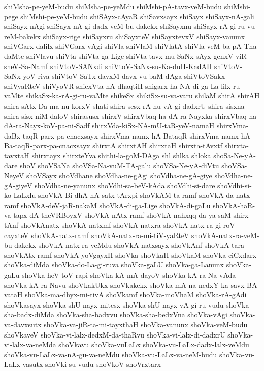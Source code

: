 {shiMsha-pe-yeM-budu
shiMsha-pe-yeMdu
shiMshi-pA-tavx-veM-budu
shiMshi-pege
shiMshi-pe-yeM-budu
shiSAyx-cAyaR
shiSavxsayx
shiSayx
shiSayx-nA-gali
shiSayx-nAgi
shiSayx-nA-gi-dadx-veM-bu-dakekx
shiSayxnu
shiSayx-rA-gi-ru-vu-reM-bakekx
shiSayx-rige
shiSayxru
shiSayxteV
shiSayxtevxV
shiSayx-vanunx
shiVGarx-dalilx
shiVGarx-vAgi
shiVla
shiVlaM
shiVlatA
shiVla-veM-ba-pA-Tha-daMte
shiVlavu
shiVta
shiVta-ga-Lige
shiVta-tavx-mu-SaNx-sAyx-genxV-viR-sheV-Sa-Namf
shiVtoV-SANxdi
shiVtoV-SaNx-su-Ka-duH-KadAH
shiVtoV-SaNx-yoV-riva
shiVtoV-SaTx-davxM-davx-vu-baM-dAga
shiVtoVSakx
shiVyaRteV
shiVyoVR
shicxVta-nA-dhaqtiH
shigarx-ha-NA-di-ga-La-lilx-ru-vaMte
shikaSx-ka-rA-gi-ru-vaMte
shikeSx
shikiSx-su-va-varu
shilaM
shirA
shirAH
shira-sAtx-Da-ma-nu-korxV-shati
shira-sesx-rA-hu-vA-gi-dadxrU
shira-sisxna
shira-sisx-niM-daloV
shirasusx
shirxV
shirxVbaq-ha-dA-ra-Nayxka
shirxVbaq-ha-dA-ra-Nayx-koV-pa-ni-Sadf
shirxVda-kiSx-NA-mU-taR-yeV-namaH
shirxVma-daBx-taqR-parx-pa-cnacxsayx
shirxVma-namx-hA-BataqR
shirxVma-namx-hA-Ba-taqR-parx-pa-cnacxsayx
shirxtA
shirxtAH
shirxtaH
shirxta-tAvxtf
shirxta-tavxtaH
shirxtayx
shirxteYva
shithi-la-goM-DAga
shl
shlka
shloka
shoSa-Ne-yA-dare
shoV
shoVSaNa
shoVSa-Na-vuM-TA-galu
shoVSa-Ne-yA-diVtu
shoVSa-NeyeV
shoVSayx
shoVdhane
shoVdha-ne-gAgi
shoVdha-ne-gA-giye
shoVdha-ne-gA-giyeV
shoVdha-ne-yanunx
shoVdhi-sa-beV-kAda
shoVdhi-si-dare
shoVdhi-si-ko-LaLxlu
shoVkA-Bi-dhA-nA-satx-tArxpi
shoVkAM-ta-ramf
shoVkA-da-natx-ramf
shoVkA-deV-jaR-nakaM
shoVkA-di-ga-Lige
shoVkA-di-gaLu
shoVkA-haR-va-tapx-dA-theVRBoyxV
shoVkA-nAtx-ramf
shoVkA-nahxqq-da-ya-saM-shirx-tAnf
shoVkAnatx
shoVkA-natxmf
shoVkA-natxra
shoVkA-natx-ra-gi-roV-cayxteV
shoVkA-natx-ramf
shoVkA-natx-ra-mi-tiV-yaRteV
shoVkA-natx-ra-veM-bu-dakekx
shoVkA-natx-ra-veMdu
shoVkA-natxsayx
shoVkAnf
shoVkA-tara
shoVkAtx-ramf
shoVkA-yoVgayxH
shoVka
shoVkaH
shoVkaM
shoVka-ciCxdarx
shoVka-diMda
shoVka-do-La-gi-ruva
shoVka-gaLU
shoVka-ga-Lanunx
shoVka-gaLu
shoVka-heV-toV-rapi
shoVka-kA-mA-dayoV
shoVka-kA-ra-Na-vAda
shoVka-kA-ra-Navu
shoVkakUkx
shoVkakekx
shoVka-mA-na-nedxY-ka-savx-BA-vataH
shoVka-ma-dhyx-mi-tivA
shoVkamf
shoVka-moVhaM
shoVka-rA-gAdi
shoVkasayx
shoVka-shU-nayx-mitesx
shoVka-shU-nayx-vA-gi-ru-vudu
shoVka-sha-badx-diMda
shoVka-sha-badxvu
shoVka-sha-bedxVna
shoVka-vAgi
shoVka-va-davxsutx
shoVka-va-jiR-ta-mi-tayxthaH
shoVka-vanunx
shoVka-veM-budu
shoVkaveV
shoVka-vi-lalx-dedxM-da-thaRvu
shoVka-vi-lalx-di-dadxrU
shoVka-vi-lalx-va-neMda
shoVkavu
shoVka-vuLaLx
shoVka-vu-LaLx-dadx-lalx-veMdu
shoVka-vu-LaLx-va-nA-gu-va-neMdu
shoVka-vu-LaLx-va-neM-budu
shoVka-vu-LaLx-vasutx
shoVki-su-vudu
shoVkoV
shoVrxtarx
}
